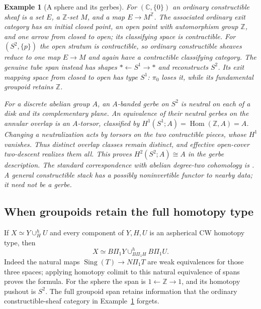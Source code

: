 \documentclass[11pt,a4paper]{article}
\newtheorem{example}[theorem]{Example}
\theoremstyle{definition}
\newcommand{\C}{\mathbb C}
\begin{document}
\begin{example}[A sphere and its gerbes]\label{ex:gerbes}
For $(\C,\{0\})$ an ordinary constructible sheaf is a set $E$,
a $\mathbb Z$-set $M$, and a map $E\to M^{\mathbb Z}$. The associated
ordinary exit category has an initial closed point, an open point with
automorphism group $\mathbb Z$, and one arrow from closed to open;
its classifying space is contractible. For $(S^2,\{p\})$ the open
stratum is contractible, so ordinary constructible sheaves reduce to
one map $E\to M$ and again have a contractible classifying category.
The genuine tube span instead has shapes $*\leftarrow S^1\to *$
and reconstructs $S^2$. Its exit mapping space from closed to open
has type $S^1$: $\pi_0$ loses it, while its fundamental groupoid
retains $\mathbb Z$.

For a discrete abelian group $A$, an $A$-banded gerbe on $S^2$ is
neutral on each of a disk and its complementary plane. An equivalence
of their neutral gerbes on the annular overlap is an $A$-torsor,
classified by $H^1(S^1;A)=\operatorname{Hom}(\mathbb Z,A)=A$.
Changing a neutralization acts by torsors on the two contractible
pieces, whose $H^1$ vanishes. Thus distinct overlap classes remain
distinct, and effective open-cover two-descent realizes them all.
This proves $H^2(S^2;A)\cong A$ in the gerbe description. The
standard correspondence with abelian degree-two cohomology is
\cite[Theorem~2.7 and Remark~3.1]{Deopurkar}. A general constructible
stack has a possibly noninvertible functor to nearby data; it need
not be a gerbe.
\end{example}

\subsection{When groupoids retain the full homotopy type}
If $X\simeq Y\cup^h_H U$ and every component of $Y,H,U$ is an
aspherical CW homotopy type, then
\[
 X\simeq B\Pi_1Y\cup^h_{B\Pi_1H}B\Pi_1U.
\]
Indeed the natural maps $\operatorname{Sing}(T)\to N\Pi_1T$ are
weak equivalences for those three spaces; applying homotopy colimit
to this natural equivalence of spans proves the formula. For the
sphere the span is $1\leftarrow\mathbb Z\to1$, and its homotopy
pushout is $S^2$. The full groupoid span retains information that the
ordinary constructible-sheaf category in Example~\ref{ex:gerbes}
forgets.
\end{document}
